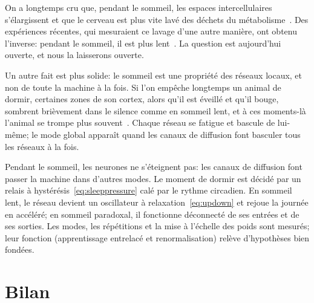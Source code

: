 On a longtemps cru que, pendant le sommeil, les espaces intercellulaires s'élargissent et que le cerveau est plus vite lavé des déchets du métabolisme~\cite{Xie2013}. Des expériences récentes, qui mesuraient ce lavage d'une autre manière, ont obtenu l'inverse: pendant le sommeil, il est plus lent~\cite{Miao2024}. La question est aujourd'hui ouverte, et nous la laisserons ouverte.

Un autre fait est plus solide: le sommeil est une propriété des réseaux locaux, et non de toute la machine à la fois. Si l'on empêche longtemps un animal de dormir, certaines zones de son cortex, alors qu'il est éveillé et qu'il bouge, sombrent brièvement dans le silence comme en sommeil lent, et à ces moments-là l'animal se trompe plus souvent~\cite{Vyazovskiy2011}. Chaque réseau se fatigue et bascule de lui-même; le mode global apparaît quand les canaux de diffusion font basculer tous les réseaux à la fois.

\begin{keyblock}
\begin{proposition}
\label{prop:sleep}
Pendant le sommeil, les neurones ne s'éteignent pas: les canaux de diffusion font passer la machine dans d'autres modes. Le moment de dormir est décidé par un relais à hystérésis~\eqref{eq:sleeppressure} calé par le rythme circadien. En sommeil lent, le réseau devient un oscillateur à relaxation~\eqref{eq:updown} et rejoue la journée en accéléré; en sommeil paradoxal, il fonctionne déconnecté de ses entrées et de ses sorties. Les modes, les répétitions et la mise à l'échelle des poids sont mesurés; leur fonction (apprentissage entrelacé et renormalisation) relève d'hypothèses bien fondées.
\end{proposition}
\end{keyblock}

\section{Bilan}

